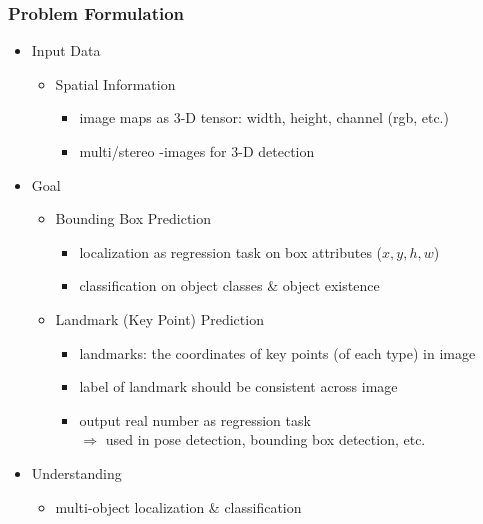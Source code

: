 \subsubsection{Problem Formulation}
\begin{itemize}
\item Input Data
	\begin{itemize}
	\item Spatial Information
		\begin{itemize}
		\item image maps as $3$-D tensor: width, height, channel (rgb, etc.)
		\item multi/stereo -images for $3$-D detection
		\end{itemize}
	\end{itemize}

\item Goal
	\begin{itemize}
	\item Bounding Box Prediction
		\begin{itemize}
		\item localization as regression task on box attributes ($x,y,h,w$)
		\item classification on object classes \& object existence
		\end{itemize}
	\item Landmark (Key Point) Prediction
		\begin{itemize}
		\item landmarks: the coordinates of key points (of  each type) in image
		\item label of landmark should be consistent across image
		\item output real number as regression task \\
		$\Rightarrow$ used in pose detection, bounding box detection, etc.
		\end{itemize}
	\end{itemize}

\item Understanding
	\begin{itemize}
	\item multi-object localization \& classification
	\end{itemize}
\end{itemize}

